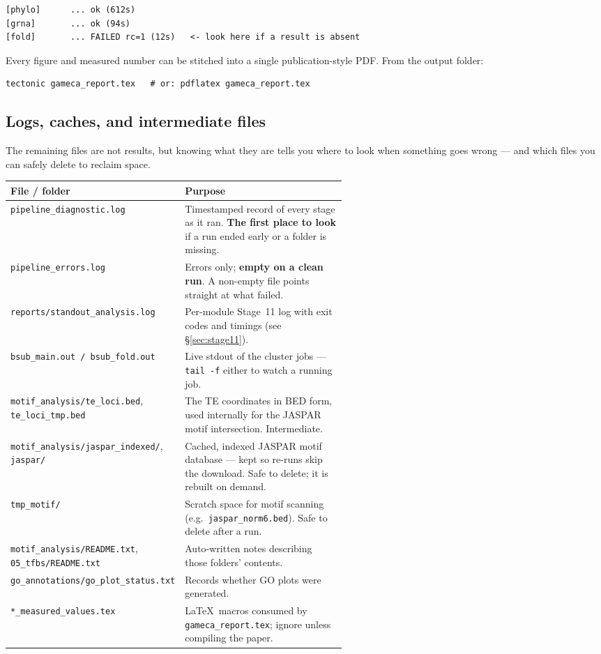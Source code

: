 \documentclass[11pt]{article}
\begin{document}
\begin{lstlisting}
[phylo]      ... ok (612s)
[grna]       ... ok (94s)
[fold]       ... FAILED rc=1 (12s)   <- look here if a result is absent
\end{lstlisting}

\medskip
\noindent Every figure and measured number can be stitched into a single
publication-style PDF. From the output folder:

\begin{lstlisting}
tectonic gameca_report.tex   # or: pdflatex gameca_report.tex
\end{lstlisting}

\subsection{Logs, caches, and intermediate files}

The remaining files are not results, but knowing what they are tells you
where to look when something goes wrong --- and which files you can safely
delete to reclaim space.

\begin{tabular}{@{}lp{0.56\linewidth}@{}}
\toprule
File / folder & Purpose \\
\midrule
\texttt{pipeline\_diagnostic.log}
  & Timestamped record of every stage as it ran. \textbf{The first place
    to look} if a run ended early or a folder is missing. \\[4pt]
\texttt{pipeline\_errors.log}
  & Errors only; \textbf{empty on a clean run}. A non-empty file points
    straight at what failed. \\[4pt]
\texttt{reports/standout\_analysis.log}
  & Per-module Stage~11 log with exit codes and timings (see
    \S\ref{sec:stage11}). \\[4pt]
\texttt{bsub\_main.out / bsub\_fold.out}
  & Live stdout of the cluster jobs --- \texttt{tail -f} either to watch a
    running job. \\[4pt]
\texttt{motif\_analysis/te\_loci.bed}, \texttt{te\_loci\_tmp.bed}
  & The TE coordinates in BED form, used internally for the JASPAR motif
    intersection. Intermediate. \\[4pt]
\texttt{motif\_analysis/jaspar\_indexed/}, \texttt{jaspar/}
  & Cached, indexed JASPAR motif database --- kept so re-runs skip the
    download. Safe to delete; it is rebuilt on demand. \\[4pt]
\texttt{tmp\_motif/}
  & Scratch space for motif scanning (e.g.\ \texttt{jaspar\_norm6.bed}).
    Safe to delete after a run. \\[4pt]
\texttt{motif\_analysis/README.txt}, \texttt{05\_tfbs/README.txt}
  & Auto-written notes describing those folders' contents. \\[4pt]
\texttt{go\_annotations/go\_plot\_status.txt}
  & Records whether GO plots were generated. \\[4pt]
\texttt{*\_measured\_values.tex}
  & \LaTeX\ macros consumed by \texttt{gameca\_report.tex}; ignore unless
    compiling the paper. \\
\bottomrule
\end{tabular}
\end{document}
